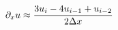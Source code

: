 \documentclass[preview]{standalone}
\begin{document}
\begin{align*}
\special{dvisvgm:raw <g id='unique000'>}\partial_x u \approx \frac{3u_i - 4u_{i-1} + u_{i-2}}{2\Delta x}\special{dvisvgm:raw </g>}
\end{align*}
\end{document}

